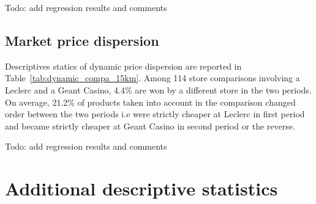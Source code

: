 \documentclass[english]{article}
\begin{document}
Todo: add regression results and comments

\subsection{Market price dispersion}

Descriptives statics of dynamic price dispersion are reported in Table~\ref{tab:dynamic_compa_15km}. Among 114 store comparisons involving a Leclerc and a Geant Casino, 4.4\% are won by a different store in the two periods. On average, 21.2\% of products taken into account in the comparison changed order between the two periods i.e were strictly cheaper at Leclerc in first period and became strictly cheaper at Geant Casino in second period or the reverse.

Todo: add regression results and comments

\newpage



\newpage

\appendix

\section{Additional descriptive statistics}
\end{document}
